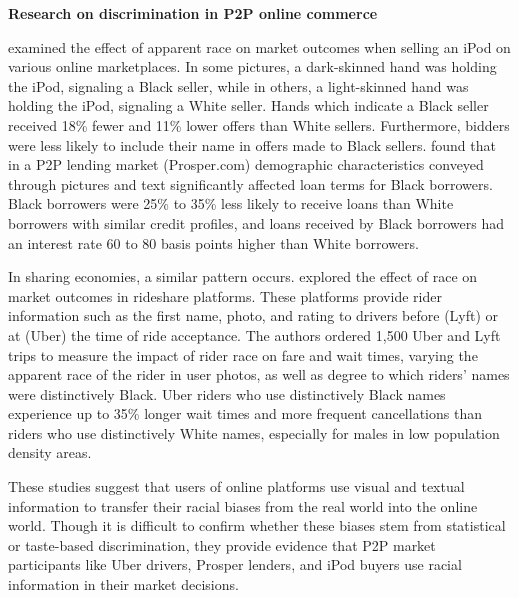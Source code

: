 


\vspace{5mm}
\textbf{Research on discrimination in P2P online commerce}

\cite{doleac} examined the effect of apparent race on market outcomes when selling an iPod on various online marketplaces. In some pictures, a dark-skinned hand was holding the iPod, signaling a Black seller, while in others, a light-skinned hand was holding the iPod, signaling a White seller. Hands which indicate a Black seller received 18\% fewer and 11\% lower offers than White sellers. Furthermore, bidders were less likely to include their name in offers made to Black sellers. \cite{pope} found that in a P2P lending market (Prosper.com) demographic characteristics conveyed through pictures and text significantly affected loan terms for Black borrowers. Black borrowers were 25\% to 35\% less likely to receive loans than White borrowers with similar credit profiles, and loans received by Black borrowers had an interest rate 60 to 80 basis points higher than White borrowers.

In sharing economies, a similar pattern occurs. \cite{knittel} explored the effect of race on market outcomes in rideshare platforms. These platforms provide rider information such as the first name, photo, and rating to drivers before (Lyft) or at (Uber) the time of ride acceptance. The authors ordered 1,500 Uber and Lyft trips to measure the impact of rider race on fare and wait times, varying the apparent race of the rider in user photos, as well as degree to which riders’ names were distinctively Black. Uber riders who use distinctively Black names experience up to 35\% longer wait times and more frequent cancellations than riders who use distinctively White names, especially for males in low population density areas.

These studies suggest that users of online platforms use visual and textual information to transfer their racial biases from the real world into the online world. Though it is difficult to confirm whether these biases stem from statistical or taste-based discrimination, they provide evidence that P2P market participants like Uber drivers, Prosper lenders, and iPod buyers use racial information in their market decisions. 



